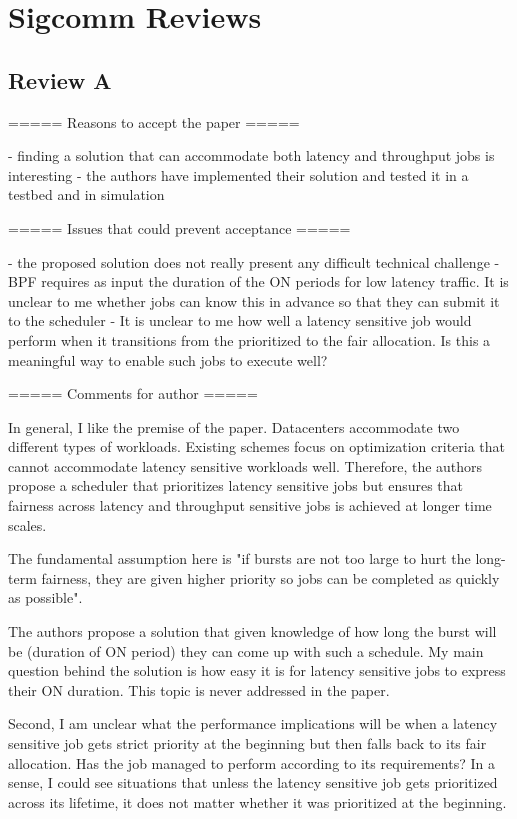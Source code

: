 \section{Sigcomm Reviews}

\subsection{Review A}

 ===== Reasons to accept the paper =====
 
 - finding a solution that can accommodate both latency and throughput jobs is interesting
 - the authors have implemented their solution and tested it in a testbed and in simulation
 
 ===== Issues that could prevent acceptance =====
 
 - the proposed solution does not really present any difficult technical challenge
 - BPF requires as input the duration of the ON periods for low latency traffic. It is unclear to me whether jobs can know this in advance so that they can submit it to the scheduler
 - It is unclear to me how well a latency sensitive job would perform when it transitions from the prioritized to the fair allocation. Is this a meaningful way to enable such jobs to execute well?
 
 ===== Comments for author =====
 
 In general, I like the premise of the paper. Datacenters accommodate two different types of workloads. Existing schemes focus on optimization criteria that cannot accommodate latency sensitive workloads well. Therefore, the authors propose a scheduler that prioritizes latency sensitive jobs but ensures that fairness across latency and throughput sensitive jobs is achieved at longer time scales.
 
 The fundamental assumption here is "if bursts are not too large to hurt the long-term fairness, they are given higher priority so jobs can be completed as quickly as possible".
 
 The authors propose a solution that given knowledge of how long the burst will be (duration of ON period) they can come up with such a schedule. My main question behind the solution is how easy it is for latency sensitive jobs to express their ON duration. This topic is never addressed in the paper.
 
 Second, I am unclear what the performance implications will be when a latency sensitive job gets strict priority at the beginning but then falls back to its fair allocation. Has the job managed to perform according to its requirements? In a sense, I could see situations that unless the latency sensitive job gets prioritized across its lifetime, it does not matter whether it was prioritized at the beginning.
 
